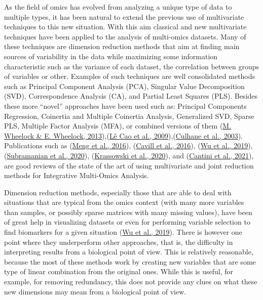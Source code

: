 \documentclass[a4paper, nobind]{templates/ociamthesis}
\begin{document}
As the field of omics has evolved from analyzing a unique type of data to multiple types, it has been natural to extend the previous use of multivariate techniques to this new situation. With this aim classical and new multivariate techniques have been applied to the analysis of multi-omics datasets. Many of these techniques are dimension reduction methods that aim at finding main sources of variability in the data while maximizing some information characteristic such as the variance of each dataset, the correlation between groups of variables or other. Examples of such techniques are well consolidated methods such as Principal Component Analysis (PCA), Singular Value Decomposition (SVD), Correspondence Analysis (CA), and Partial Least Squares (PLS). Besides these more ``novel'' approaches have been used such as: Principal Components Regression, Coinertia and Multiple Coinertia Analysis, Generalized SVD, Sparse PLS, Multiple Factor Analysis (MFA), or combined versions of them (\protect\hyperlink{ref-mwheelock_trials_2013}{M. Wheelock \& E. Wheelock, 2013}),(\protect\hyperlink{ref-le_cao_sparse_2009}{Lê Cao et al., 2009}),(\protect\hyperlink{ref-culhane_cross-platform_2003}{Culhane et al., 2003}). Publications such as (\protect\hyperlink{ref-meng_dimension_2016}{Meng et al., 2016}), (\protect\hyperlink{ref-cavill_transcriptomic_2016}{Cavill et al., 2016}), (\protect\hyperlink{ref-wu_selective_2019}{Wu et al., 2019}), (\protect\hyperlink{ref-subramanian_multi-omics_2020}{Subramanian et al., 2020}), (\protect\hyperlink{ref-krassowski_state_2020}{Krassowski et al., 2020}), and (\protect\hyperlink{ref-cantini_benchmarking_2021}{Cantini et al., 2021}), are good reviews of the state of the art of using multivariate and joint reduction methods for Integrative Multi-Omics Analysis.

Dimension reduction methods, especially those that are able to deal with situations that are typical from the omics context (with many more variables than samples, or possibly sparse matrices with many missing values), have been of great help in visualizing datasets or even for performing variable selection to find biomarkers for a given situation (\protect\hyperlink{ref-wu_selective_2019}{Wu et al., 2019}). There is however one point where they underperform other approaches, that is, the difficulty in interpreting results from a biological point of view. This is relatively reasonable, because the most of these methods work by creating new variables that are some type of linear combination from the original ones. While this is useful, for example, for removing redundancy, this does not provide any clues on what these new dimensions may mean from a biological point of view.
\end{document}
